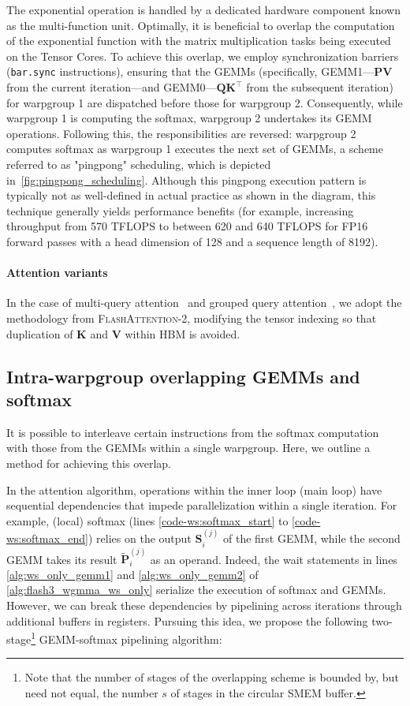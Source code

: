 The exponential operation is handled by a dedicated hardware component known as the multi-function unit. Optimally, it is beneficial to overlap the computation of the exponential function with the matrix multiplication tasks being executed on the Tensor Cores. To achieve this overlap, we employ synchronization barriers (\texttt{bar.sync} instructions), ensuring that the GEMMs (specifically, GEMM1—$\mathbf{P} \mathbf{V}$ from the current iteration—and GEMM0—$\mathbf{Q} \mathbf{K}^\top$ from the subsequent iteration) for warpgroup 1 are dispatched before those for warpgroup 2. Consequently, while warpgroup 1 is computing the softmax, warpgroup 2 undertakes its GEMM operations. Following this, the responsibilities are reversed: warpgroup 2 computes softmax as warpgroup 1 executes the next set of GEMMs, a scheme referred to as "pingpong" scheduling, which is depicted in~\cref{fig:pingpong_scheduling}. Although this pingpong execution pattern is typically not as well-defined in actual practice as shown in the diagram, this technique generally yields performance benefits (for example, increasing throughput from 570 TFLOPS to between 620 and 640 TFLOPS for FP16 forward passes with a head dimension of 128 and a sequence length of 8192).

\paragraph{Attention variants} In the case of multi-query attention~\citep{shazeer2019fast} and grouped query attention~\citep{ainslie2023gqa}, we adopt the methodology from \textsc{FlashAttention-2}, modifying the tensor indexing so that duplication of $\mathbf{K}$ and $\mathbf{V}$ within HBM is avoided.

\subsection{Intra-warpgroup overlapping GEMMs and softmax}

It is possible to interleave certain instructions from the softmax computation with those from the GEMMs within a single warpgroup. Here, we outline a method for achieving this overlap.

In the attention algorithm, operations within the inner loop (main loop) have sequential dependencies that impede parallelization within a single iteration. For example, (local) softmax (lines \ref{code-ws:softmax_start} to \ref{code-ws:softmax_end}) relies on the output $\mathbf{S}_i^{(j)}$ of the first GEMM, while the second GEMM takes its result $\widetilde{\mathbf{P}}_i^{(j)}$ as an operand. Indeed, the wait statements in lines \ref{alg:ws_only_gemm1} and \ref{alg:ws_only_gemm2} of \cref{alg:flash3_wgmma_ws_only} serialize the execution of softmax and GEMMs. However, we can break these dependencies by pipelining across iterations through additional buffers in registers. Pursuing this idea, we propose the following two-stage\footnote{Note that the number of stages of the overlapping scheme is bounded by, but need not equal, the number $s$ of stages in the circular SMEM buffer.} GEMM-softmax pipelining algorithm:

